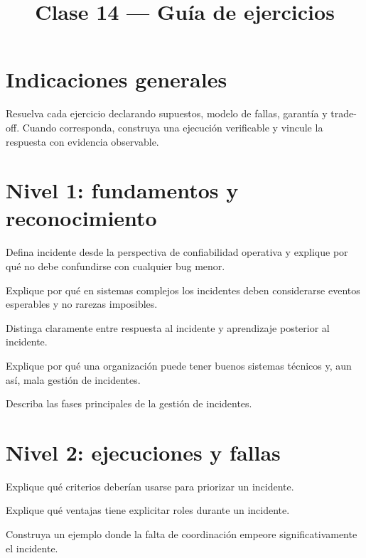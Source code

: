 \documentclass[variant=guia,cover=institutional,mode=screen]{ua-engineering-v6-article}
\title{Clase 14 --- Guía de ejercicios}
\author{\UAProfessor}
\date{\UADate}
\begin{document}
\section{Indicaciones generales}
Resuelva cada ejercicio declarando supuestos, modelo de fallas, garantía y trade-off. Cuando corresponda, construya una ejecución verificable y vincule la respuesta con evidencia observable.

\section{Nivel 1: fundamentos y reconocimiento}
\begin{uaexercise}
Defina incidente desde la perspectiva de confiabilidad operativa y explique por qué no debe confundirse con cualquier bug menor.
\end{uaexercise}

\begin{uaexercise}
Explique por qué en sistemas complejos los incidentes deben considerarse eventos esperables y no rarezas imposibles.
\end{uaexercise}

\begin{uaexercise}
Distinga claramente entre respuesta al incidente y aprendizaje posterior al incidente.
\end{uaexercise}

\begin{uaexercise}
Explique por qué una organización puede tener buenos sistemas técnicos y, aun así, mala gestión de incidentes.
\end{uaexercise}

\begin{uaexercise}
Describa las fases principales de la gestión de incidentes.
\end{uaexercise}


\section{Nivel 2: ejecuciones y fallas}
\begin{uaexercise}
Explique qué criterios deberían usarse para priorizar un incidente.
\end{uaexercise}

\begin{uaexercise}
Explique qué ventajas tiene explicitar roles durante un incidente.
\end{uaexercise}

\begin{uaexercise}
Construya un ejemplo donde la falta de coordinación empeore significativamente el incidente.
\end{uaexercise}
\end{document}
